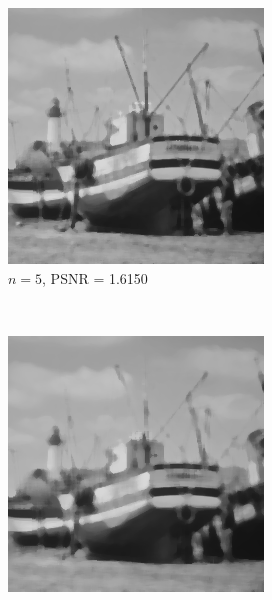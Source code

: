 \documentclass{article}
\begin{document}
\begin{enumerate}[label=(\alph*)]
\begin{figure}[!htb]
        \begin{subfigure}[b]{0.3\textwidth}
            \includegraphics[width=\textwidth]{img/RS5.png}
            \caption{$n = 5$, PSNR = 1.6150}
        \end{subfigure}
        ~
        \begin{subfigure}[b]{0.3\textwidth}
            \includegraphics[width=\textwidth]{img/RS7.png}

\end{subfigure}
\end{figure}
\end{enumerate}
\end{document}
